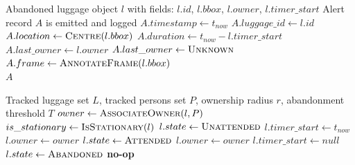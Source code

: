 \begin{algorithm}[!htbp]
	\caption{Alert generation logic.}
	\label{alg:alert_generation}
	\begin{algorithmic}[1]
		\Require Abandoned luggage object $l$ with fields: $l.id$, $l.bbox$, $l.owner$, $l.timer\_start$
		\Ensure Alert record $A$ is emitted and logged
		\State $A.timestamp \gets t_{now}$
		\State $A.luggage\_id \gets l.id$
		\State $A.location \gets \Call{Centre}{l.bbox}$ 
		\State $A.duration \gets t_{now} - l.timer\_start$ 
		\State $A.last\_owner \gets l.owner$ 
		\Else
		\State $A.last\_owner \gets \textsc{Unknown}$
		\EndIf
		\State $A.frame \gets \Call{AnnotateFrame}{l.bbox}$ 
		\State {} 
		\State {} \\
		\Return $A$
	\end{algorithmic}
\end{algorithm}

\begin{algorithm}[!htbp]
	\caption{Luggage state transition logic.}
	\label{alg:state_transitions}
	\begin{algorithmic}[1]
		\Require Tracked luggage set $L$, tracked persons set $P$, ownership radius $r$, abandonment threshold $T$
		\State $owner \gets \Call{AssociateOwner}{l, P}$ 
		\State $is\_stationary \gets \Call{IsStationary}{l}$ 
		\State $l.state \gets \textsc{Unattended}$
		\State $l.timer\_start \gets t_{now}$
		\Else
		\State $l.owner \gets owner$ 
		\EndIf
		\EndCase
		\State $l.state \gets \textsc{Attended}$
		\State $l.owner \gets owner$
		\State $l.timer\_start \gets null$ 
		\State $l.state \gets \textsc{Abandoned}$
		\State {} 
		\EndIf
		\EndCase
		\State \textbf{no-op} 
		\EndCase
		\EndSwitch
		\EndFor
	\end{algorithmic}
\end{algorithm}

